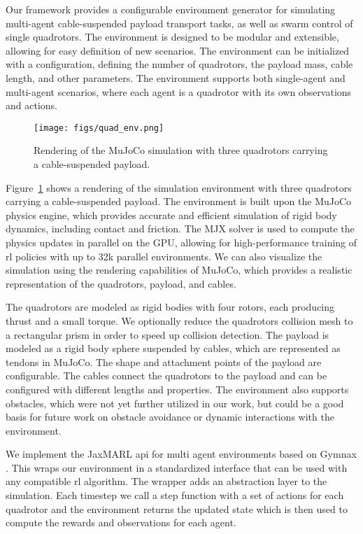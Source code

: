 Our framework provides a configurable environment generator for simulating multi-agent cable-suspended payload transport tasks, as well as swarm control of single quadrotors. The environment is designed to be modular and extensible, allowing for easy definition of new scenarios. The environment can be initialized with a configuration, defining the number of quadrotors, the payload mass, cable length, and other parameters. The environment supports both single-agent and multi-agent scenarios, where each agent is a quadrotor with its own observations and actions.
\begin{figure}
\centering
\texttt{[image: figs/quad\_env.png]}
\caption[Simulation Environment]{Rendering of the MuJoCo simulation with three quadrotors carrying a cable-suspended payload.}
\label{fig:crazyflie_env}
\end{figure}

Figure~\ref{fig:crazyflie_env} shows a rendering of the simulation environment with three quadrotors carrying a cable-suspended payload. The environment is built upon the MuJoCo physics engine, which provides accurate and efficient simulation of rigid body dynamics, including contact and friction. The MJX solver is used to compute the physics updates in parallel on the GPU, allowing for high-performance training of \gls{rl} policies with up to 32k parallel environments. We can also visualize the simulation using the rendering capabilities of MuJoCo, which provides a realistic representation of the quadrotors, payload, and cables.

The quadrotors are modeled as rigid bodies with four rotors, each producing thrust and a small torque. We optionally reduce the quadrotors collision mesh to a rectangular prism in order to speed up collision detection. The payload is modeled as a rigid body sphere suspended by cables, which are represented as tendons in MuJoCo. The shape and attachment points of the payload are configurable. The cables connect the quadrotors to the payload and can be configured with different lengths and properties. The environment also supports obstacles, which were not yet further utilized in our work, but could be a good basis for future work on obstacle avoidance or dynamic interactions with the environment.

We implement the JaxMARL \gls{api} for multi agent environments based on Gymnax \autocite{gymnax2022github}. This wraps our environment in a standardized interface that can be used with any compatible \gls{rl} algorithm. The wrapper adds an abstraction layer to the simulation. Each timestep we call a step function with a set of actions for each quadrotor and the environment returns the updated state which is then used to compute the rewards and observations for each agent.

